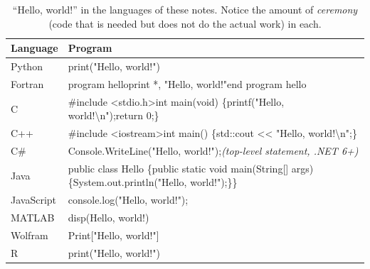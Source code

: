 \begin{table}[htbp]
\centering
\caption{``Hello, world!'' in the languages of these notes. Notice the amount of
\emph{ceremony} (code that is needed but does not do the actual work) in each.}
\label{tab:hello}
\small
\begin{tabularx}{\linewidth}{@{}l>{\raggedright\arraybackslash\ttfamily\footnotesize}X@{}}
\toprule
\textbf{Language} & \normalfont\textbf{Program}\\
\midrule
Python      & print("Hello, world!")\\[3pt]
Fortran     & program hello\newline\hspace*{1em}print *, "Hello, world!"\newline end program hello\\[3pt]
C           & \#include <stdio.h>\newline int main(void) \{\newline\hspace*{1em}printf("Hello, world!\textbackslash n");\newline\hspace*{1em}return 0;\newline\}\\[3pt]
C++         & \#include <iostream>\newline int main() \{\newline\hspace*{1em}std::cout << "Hello, world!\textbackslash n";\newline\}\\[3pt]
C\#         & Console.WriteLine("Hello, world!");\hfill\normalfont\textit{(top-level statement, .NET 6+)}\\[3pt]
Java        & public class Hello \{\newline\hspace*{1em}public static void main(String[] args) \{\newline\hspace*{2em}System.out.println("Hello, world!");\newline\hspace*{1em}\}\newline\}\\[3pt]
JavaScript  & console.log("Hello, world!");\\[3pt]
MATLAB      & disp(\textquotesingle{}Hello, world!\textquotesingle{})\\[3pt]
Wolfram     & Print["Hello, world!"]\\[3pt]
R           & print("Hello, world!")\\[3pt]

\end{tabularx}
\end{table}
